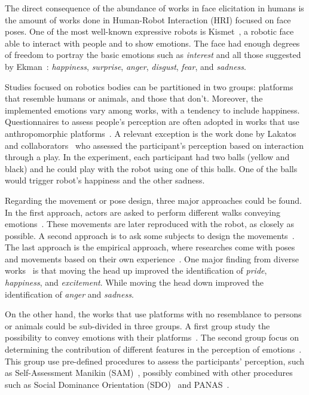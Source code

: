The direct consequence of the abundance of works in face elicitation in humans is the amount of works done in Human-Robot Interaction (HRI) focused on face poses. One of the most well-known expressive robots is Kismet~\cite{Breazeal2002}, a robotic face able to interact with people and to show emotions. The face had enough degrees of freedom to portray the basic emotions such as \textit{interest} and all those suggested by Ekman~\cite{Ekman2004}: \textit{happiness}, \textit{surprise}, \textit{anger}, \textit{disgust}, \textit{fear}, and \textit{sadness}.

Studies focused on robotics bodies can be partitioned in two groups: platforms that resemble humans or animals, and those that don't. Moreover, the implemented emotions vary among works, with a tendency to include happiness. Questionnaires to assess people's perception are often adopted in works that use anthropomorphic platforms~\cite{Canamero2010,Beck2010,Li2011,Destephe2013b,Arras2012,Brown2014}. A relevant exception is the work done by Lakatos and collaborators~\cite{Lakatos2014} who assessed the participant's perception based on interaction through a play. In the experiment, each participant had two balls (yellow and black) and he could play with the robot using one of this balls. One of the balls would trigger robot's happiness and the other sadness. 

Regarding the movement or pose design, three major approaches could be found. In the first approach, actors are asked to perform different walks conveying emotions~\cite{Destephe2013b}. These movements are later reproduced with the robot, as closely as possible. A second approach is to ask some subjects to design the movements~\cite{Li2011}. The last approach is the empirical approach, where researches come with poses and movements based on their own experience~\cite{Canamero2010,Beck2010,Arras2012,Brown2014}. One major finding from diverse works~\cite{Canamero2010,Beck2010,Brown2014} is that moving the head up improved the identification of \textit{pride}, \textit{happiness}, and \textit{excitement}. While moving the head down improved the identification of \textit{anger} and \textit{sadness}.  

On the other hand, the works that use platforms with no resemblance to persons or animals could be sub-divided in three groups. A first group study the possibility to convey emotions with their platforms~\cite{Arras2012, Novika2015, BarakovaL10}. The second group focus on determining the contribution of different features in the perception of emotions~\cite{Saerbeck2010,Barakova2013, Sharma2013, NAM2014}.
This group use pre-defined procedures to assess the participants' perception, such as Self-Assessment Manikin (SAM)~\cite{Lang2008}, possibly combined  with other procedures such as Social Dominance Orientation (SDO)~\cite{pratto1994social} and PANAS~\cite{WatsonClarkTellegen88}. 

